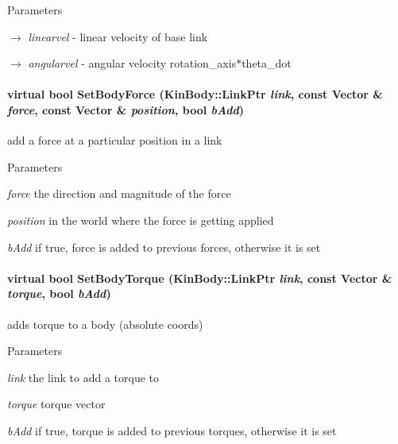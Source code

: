 \begin{DoxyParams}{Parameters}
\item[\mbox{$\rightarrow$} {\em linearvel}]-\/ linear velocity of base link \item[\mbox{$\rightarrow$} {\em angularvel}]-\/ angular velocity rotation\_\-axis$\ast$theta\_\-dot \end{DoxyParams}
\hypertarget{classOpenRAVE_1_1PhysicsEngineBase_aac5b2aa6d0506ac155b01c4a981970e6}{
\paragraph[{SetBodyForce}]{\setlength{\rightskip}{0pt plus 5cm}virtual bool SetBodyForce (KinBody::LinkPtr {\em link}, \/  const Vector \& {\em force}, \/  const Vector \& {\em position}, \/  bool {\em bAdd})}\hfill}
\label{classOpenRAVE_1_1PhysicsEngineBase_aac5b2aa6d0506ac155b01c4a981970e6}
add a force at a particular position in a link 
\begin{DoxyParams}{Parameters}
\item[{\em force}]the direction and magnitude of the force \item[{\em position}]in the world where the force is getting applied \item[{\em bAdd}]if true, force is added to previous forces, otherwise it is set \end{DoxyParams}
\hypertarget{classOpenRAVE_1_1PhysicsEngineBase_a88e1824a57094ca3795b76147fa89430}{
\paragraph[{SetBodyTorque}]{\setlength{\rightskip}{0pt plus 5cm}virtual bool SetBodyTorque (KinBody::LinkPtr {\em link}, \/  const Vector \& {\em torque}, \/  bool {\em bAdd})}\hfill}
\label{classOpenRAVE_1_1PhysicsEngineBase_a88e1824a57094ca3795b76147fa89430}
adds torque to a body (absolute coords) 
\begin{DoxyParams}{Parameters}
\item[{\em link}]the link to add a torque to \item[{\em torque}]torque vector \item[{\em bAdd}]if true, torque is added to previous torques, otherwise it is set \end{DoxyParams}
